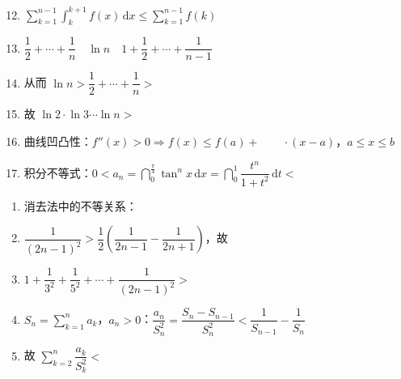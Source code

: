 \documentclass[a4paper,12pt]{article}
\begin{document}
    \begin{minipage}[t]{0.30\textwidth}
        \begin{enumerate}[leftmargin=*, itemsep=1.4em]
            \setcounter{enumi}{11}
            \item $\sum\limits_{k=1}^{n-1}\!\int_k^{k+1} f(x)\,\mathrm{d}x \le \sum\limits_{k=1}^{n-1} f(k)$
            \item $\dfrac{1}{2}+\cdots+\dfrac{1}{n} \quad \ln n \quad 1+\dfrac{1}{2}+\cdots+\dfrac{1}{n-1}$
            \item 从而 $\ln n > \dfrac{1}{2}+\cdots+\dfrac{1}{n} >$
            \item 故 $\ln 2 \cdot \ln 3 \cdots \ln n >$
        \end{enumerate}
    \end{minipage}
    \hfill
    \begin{minipage}[t]{0.30\textwidth}
        \begin{enumerate}[leftmargin=*, itemsep=1.4em]
            \setcounter{enumi}{15}
            \item 曲线凹凸性：$f''(x)>0 \Rightarrow f(x) \le f(a) + \qquad\cdot(x-a)$，$a\le x\le b$
            \item 积分不等式：$0<a_n = \dint_0^{\frac{\pi}{4}} \tan^n x \,\mathrm{d}x = \dint_0^1 \dfrac{t^n}{1+t^2}\,\mathrm{d}t <$
        \end{enumerate}
    \end{minipage}
    \hfill
    \begin{minipage}[t]{0.30\textwidth}
        \begin{enumerate}[leftmargin=*, itemsep=1.4em]
            \item 消去法中的不等关系：
            \item $\dfrac{1}{(2n-1)^2} > \dfrac{1}{2}\left(\dfrac{1}{2n-1} - \dfrac{1}{2n+1}\right)$，故
            \item $1+\dfrac{1}{3^2}+\dfrac{1}{5^2}+\cdots+\dfrac{1}{(2n-1)^2} >$
        \end{enumerate}
    \end{minipage}
    \hfill

    \vspace{1em}

    \begin{minipage}[t]{0.46\textwidth}
        \begin{enumerate}[leftmargin=*, itemsep=1.4em]
            \setcounter{enumi}{3}
            \item $S_n = \sum\limits_{k=1}^{n} a_k$，$a_n>0$：$\dfrac{a_n}{S_n^2} = \dfrac{S_n-S_{n-1}}{S_n^2} < \dfrac{1}{S_{n-1}}-\dfrac{1}{S_n}$
        \end{enumerate}
    \end{minipage}
    \hfill
    \begin{minipage}[t]{0.46\textwidth}
        \begin{enumerate}[leftmargin=*, itemsep=1.4em]
            \setcounter{enumi}{4}
            \item 故 $\sum\limits_{k=2}^{n} \dfrac{a_k}{S_k^2} <$
        \end{enumerate}
    \end{minipage}
    \hfill
\end{document}
